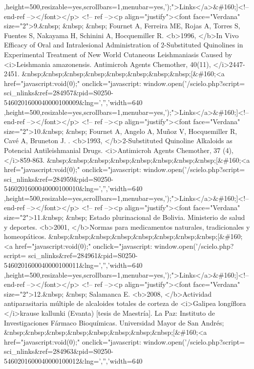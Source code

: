 ,height=500,resizable=yes,scrollbars=1,menubar=yes,');">Links</a>\&\#160;]<!--
end-ref --></font></p> <!-- ref --><p align="justify"><font face="Verdana"
size="2">9.\&nbsp; \&nbsp; \&nbsp; Fournet A, Ferreira ME, Rojas A, Torres S,
Fuentes S, Nakayama H, Schinini A, Hocquemiller R. <b>1996, </b>In Vivo Efficacy
of Oral and Intralesional Administration of 2-Substituted Quinolines in
Experimental Treatment of New World Cutaneous Leishmaniasis Caused by
<i>Leishmania amazonensis. Antimicroh Agents Chemother, 40(11), </i>2447-2451.
\&nbsp;\&nbsp;\&nbsp;\&nbsp;\&nbsp;\&nbsp;\&nbsp;\&nbsp;[\&\#160;<a
href="javascript:void(0);" onclick="javascript: window.open('/scielo.php?script=
sci\_{}nlinks\&ref=284957\&pid=S0250-5460201600040000100009\&lng=','','width=640
,height=500,resizable=yes,scrollbars=1,menubar=yes,');">Links</a>\&\#160;]<!--
end-ref --></font></p> <!-- ref --><p align="justify"><font face="Verdana"
size="2">10.\&nbsp; \&nbsp; Fournet A, Angelo A, Muñoz V, Hocquemiller R, Cavé
A, Bruneton J. . <b>1993, </b>2-Substituted Quinoline Alkaloids as Potencial
Antileishmanial Drugs. <i>Antimicroh Agents Chemother, 37 (4), </i>859-863.
\&nbsp;\&nbsp;\&nbsp;\&nbsp;\&nbsp;\&nbsp;\&nbsp;\&nbsp;[\&\#160;<a
href="javascript:void(0);" onclick="javascript: window.open('/scielo.php?script=
sci\_{}nlinks\&ref=284959\&pid=S0250-5460201600040000100010\&lng=','','width=640
,height=500,resizable=yes,scrollbars=1,menubar=yes,');">Links</a>\&\#160;]<!--
end-ref --></font></p> <!-- ref --><p align="justify"><font face="Verdana"
size="2">11.\&nbsp; \&nbsp; Estado plurinacional de Bolivia. Ministerio de salud
y deportes. <b>2001, </b>Normas para medicamentos naturales, tradicionales y
homeopáticos.
\&nbsp;\&nbsp;\&nbsp;\&nbsp;\&nbsp;\&nbsp;\&nbsp;\&nbsp;[\&\#160;<a
href="javascript:void(0);" onclick="javascript: window.open('/scielo.php?script=
sci\_{}nlinks\&ref=284961\&pid=S0250-5460201600040000100011\&lng=','','width=640
,height=500,resizable=yes,scrollbars=1,menubar=yes,');">Links</a>\&\#160;]<!--
end-ref --></font></p> <!-- ref --><p align="justify"><font face="Verdana"
size="2">12.\&nbsp; \&nbsp; Salamanca E. <b>2008, </b>Actividad antiparasitaria
múltiple de alcaloides totales de corteza de <i>Galipea longíflora </i>krause
kallunki (Evanta) [tesis de Maestría]. La Paz: Instituto de Investigaciones
Fármaco Bioquímicas. Universidad Mayor de San Andrés;
\&nbsp;\&nbsp;\&nbsp;\&nbsp;\&nbsp;\&nbsp;\&nbsp;\&nbsp;[\&\#160;<a
href="javascript:void(0);" onclick="javascript: window.open('/scielo.php?script=
sci\_{}nlinks\&ref=284963\&pid=S0250-5460201600040000100012\&lng=','','width=640
